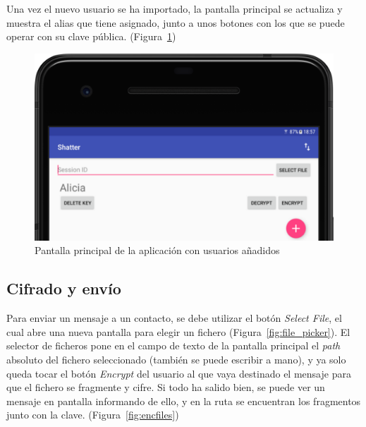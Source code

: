 Una vez el nuevo usuario se ha importado, la pantalla principal se actualiza y muestra el alias que tiene asignado, junto a unos botones con los que se puede operar con su clave pública. (Figura~\ref{fig:home_2})

\begin{figure}[!htb]
  \centering
  \includegraphics[scale=0.4]{Figures/home_2}
  \decoRule
  \caption[Shatter (Pantalla principal con usuarios)]{Pantalla principal de la aplicación con usuarios añadidos}
  \label{fig:home_2}
\end{figure}

\subsection{Cifrado y envío}

Para enviar un mensaje a un contacto, se debe utilizar el botón \emph{Select File}, el cual abre una nueva pantalla para elegir un fichero (Figura~\ref{fig:file_picker}). El selector de ficheros pone en el campo de texto de la pantalla principal el \emph{path} absoluto del fichero seleccionado (también se puede escribir a mano), y ya solo queda tocar el botón \emph{Encrypt} del usuario al que vaya destinado el mensaje para que el fichero se fragmente y cifre. Si todo ha salido bien, se puede ver un mensaje en pantalla informando de ello, y en la ruta  se encuentran los fragmentos junto con la clave. (Figura~\ref{fig:encfiles})

